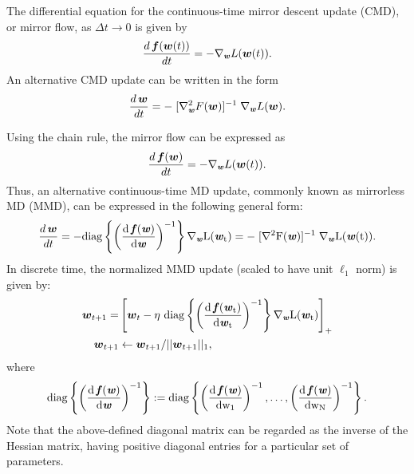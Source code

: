 \documentclass[10pt]{amsart}
\newcommand{\beq}{\begin{equation}}
\newcommand{\eeq}{\end{equation}}
\newcommand{\nn}{\nonumber}
\newcommand{\noi}{\noindent}
\newcommand{\bi}[1]{\textbf{\textit{#1}}}
\newcommand{\bof}{\boldsymbol{f}}
\newcommand{\bw}{\boldsymbol{w}}
\theoremstyle{definition}
\theoremstyle{definition}	 %
\begin{document}

The differential equation for the continuous-time mirror descent update (CMD), or mirror flow,  as $\Delta t \rightarrow 0$ is given by \cite{MD1,EGSD}
\begin{align} \label{f-1fCT}
	\frac{d\,\bof\!\left(\bw(t)\right)}{d t}= - \nabla_{\bi w} L(\bw(t)).
\end{align}
%
An alternative CMD update can be written in the form
\beq \nn
 \frac{d\,\bw}{d t} =   -  \; [\nabla_{\bi w}^2 F(\bw)]^{-1} \; \nabla_{\bi w} L(\bw).
\eeq
%


\noi Using the  chain rule, the mirror flow can be expressed as
 \beq \nn
\frac{d\,\bof\!\left(\bw \right)}{d t} =
- \nabla_{\bi w} L(\bw(t)).
\label{chainrule}
\eeq
Thus, an alternative continuous-time MD update, commonly known as mirrorless MD (MMD), can be expressed in the following general form:
\beq
 \frac{d\,\bw}{d t} =   - \rm{diag} \left\{\left(\frac{d\,\bi f(\bi w)}{d \bi w}\right)^{-1}\right\} \nabla_{\bi w} L(\bi w_t)= - \; [\nabla^2 F(\bi w)]^{-1} \; \nabla_{\bi w} L(\bi w(t)) .
\eeq
In discrete time, the normalized MMD update (scaled to have unit $\ell_1$ norm) is given by:
\begin{align}
\bw_{t+1} =& \left[\bw_t  -\eta~ \rm{diag} \left\{\left(
\frac{d\,\bi f(\bi w_t)}{d \bi w_t}\right)^{-1}\right\} \nabla_{\bi w} L(\bi w_t)\right]_+ \label{eq:33}\\ 
\bw_{t+1} &\leftarrow \bw_{t+1} /||\bw_{t+1}||_1 ,
		\label{diagMD}
\end{align}
where
\[ \displaystyle \rm{diag} \left\{ \left(\frac{d\,\bi f(\bi w)}{d \bi w}\right)^{-1}\right\} := \rm{diag} \left\{ \left(\frac{d\,\bi f(\bi w)}{d w_1} \right)^{-1}, \ldots, \left(\frac{d\,\bi f(\bi w)}{d w_N}\right)^{-1} \right\}.
\]
Note that the above-defined diagonal matrix can be regarded as the inverse of the Hessian matrix, having positive diagonal entries for a particular set of parameters.
\end{document}
